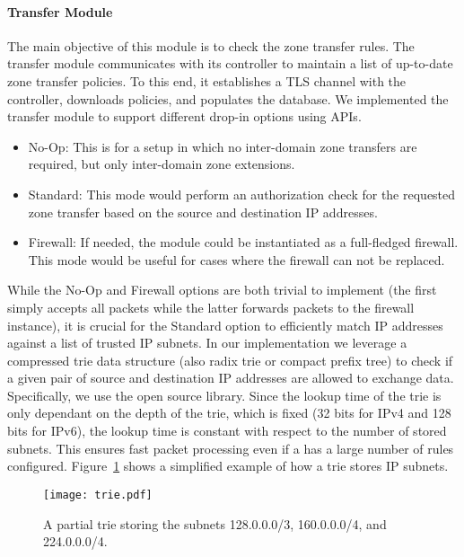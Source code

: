 \paragraph{Transfer Module}
The main objective of this module is to check the zone transfer rules. The transfer
module communicates with its controller to maintain a list of up-to-date zone transfer policies.
To this end, it establishes a TLS channel with the controller, downloads policies,
and populates the database.
We implemented the transfer module to support different drop-in options using APIs.

\begin{itemize}
	\item No-Op: This is for a setup in which no inter-domain zone transfers are required,
	      but only inter-domain zone extensions.
	\item Standard: This mode would perform an authorization check for the requested
	      zone transfer based on the source and destination IP addresses.
	\item Firewall: If needed, the module could be instantiated as a full-fledged firewall.
	      This mode would be useful for cases where the firewall can not be replaced.
\end{itemize}

While the No-Op and Firewall options are both trivial to implement (the first simply accepts all
packets while the latter forwards packets to the firewall instance), it is crucial for the Standard
option to efficiently match IP addresses against a list of trusted IP subnets. In our implementation
we leverage a compressed trie data structure (also radix trie or compact prefix tree) to check if a
given pair of source and destination IP addresses are allowed to exchange data. Specifically,
we use the open source  library. Since the
lookup time of the trie is only dependant on the depth of the trie, which is fixed (32 bits for IPv4 and 128
bits for IPv6), the lookup time is constant with respect to the number of stored subnets. This
ensures fast packet processing even if a \tp has a large number of rules configured.
Figure~\ref{fig:trie} shows a simplified example of how a trie stores IP subnets.

\begin{figure}[htb]
	\begin{center}
		\texttt{[image: trie.pdf]}
	\end{center}
	\caption{A partial trie storing the subnets 128.0.0.0/3, 160.0.0.0/4, and 224.0.0.0/4.}
	\label{fig:trie}
\end{figure}

